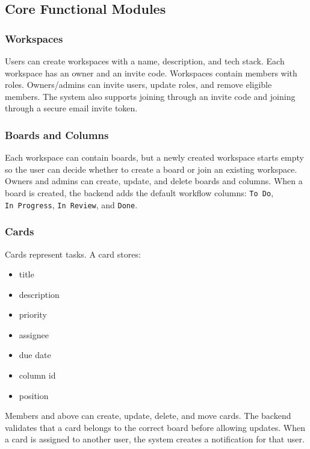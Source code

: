 \documentclass[
]{article}
\providecommand{\tightlist}{%
  \setlength{\itemsep}{0pt}\setlength{\parskip}{0pt}}
\begin{document}
\subsection{Core Functional Modules}\label{core-functional-modules}

\subsubsection{Workspaces}\label{workspaces}

Users can create workspaces with a name, description, and tech stack.
Each workspace has an owner and an invite code. Workspaces contain
members with roles. Owners/admins can invite users, update roles, and
remove eligible members. The system also supports joining through an
invite code and joining through a secure email invite token.

\subsubsection{Boards and Columns}\label{boards-and-columns}

Each workspace can contain boards, but a newly created workspace starts
empty so the user can decide whether to create a board or join an
existing workspace. Owners and admins can create, update, and delete
boards and columns. When a board is created, the backend adds the
default workflow columns: \texttt{To\ Do}, \texttt{In\ Progress},
\texttt{In\ Review}, and \texttt{Done}.

\subsubsection{Cards}\label{cards}

Cards represent tasks. A card stores:

\begin{itemize}
\tightlist
\item
  title
\item
  description
\item
  priority
\item
  assignee
\item
  due date
\item
  column id
\item
  position
\end{itemize}

Members and above can create, update, delete, and move cards. The
backend validates that a card belongs to the correct board before
allowing updates. When a card is assigned to another user, the system
creates a notification for that user.
\end{document}
